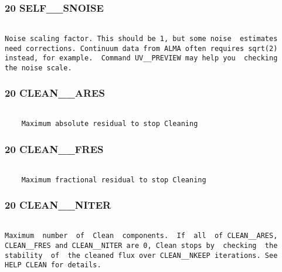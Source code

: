 \subsubsection{20 SELF\_\_SNOISE}
\begin{verbatim}

Noise scaling factor. This should be 1, but some noise  estimates
need corrections. Continuum data from ALMA often requires sqrt(2)
instead, for example.  Command UV__PREVIEW may help you  checking
the noise scale.

\end{verbatim}
\subsubsection{20 CLEAN\_\_ARES}
\begin{verbatim}

    Maximum absolute residual to stop Cleaning

\end{verbatim}
\subsubsection{20 CLEAN\_\_FRES}
\begin{verbatim}

    Maximum fractional residual to stop Cleaning

\end{verbatim}
\subsubsection{20 CLEAN\_\_NITER}
\begin{verbatim}

Maximum  number  of  Clean  components.  If  all  of CLEAN__ARES,
CLEAN__FRES and CLEAN__NITER are 0, Clean stops by  checking  the
stability  of  the cleaned flux over CLEAN__NKEEP iterations. See
HELP CLEAN for details.


























































\end{verbatim}
